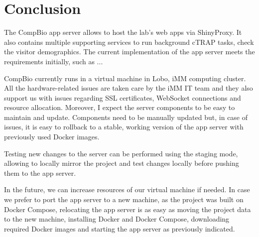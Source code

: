
\section{Conclusion}


The CompBio app server allows to host the lab's web apps via ShinyProxy. It also contains multiple supporting services to run background cTRAP tasks, check the visitor demographics. The current implementation of the app server meets the requirements initially, such as ...

CompBio currently runs in a virtual machine in Lobo, iMM computing cluster. All the hardware-related issues are taken care by the iMM IT team and they also support us with issues regarding SSL certificates, WebSocket connections and resource allocation. Moreover, I expect the server components to be easy to maintain and update. Components need to be manually updated but, in case of issues, it is easy to rollback to a stable, working version of the app server with previously used Docker images.

Testing new changes to the server can be performed using the staging mode, allowing to locally mirror the project and test changes locally before pushing them to the app server.

In the future, we can increase resources of our virtual machine if needed. In case we prefer to port the app server to a new machine, as the project was built on Docker Compose, relocating the app server is as easy as moving the project data to the new machine, installing Docker and Docker Compose, downloading required Docker images and starting the app server as previously indicated.
